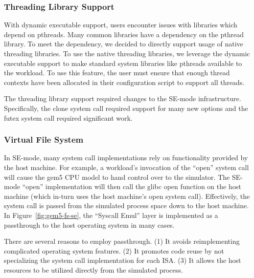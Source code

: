 \subsubsection{Threading Library Support}

With dynamic executable support, users encounter issues with libraries which depend on pthreads.
Many common libraries have a dependency on the pthread library.
To meet the dependency, we decided to directly support usage of native threading libraries.
To use the native threading libraries, we leverage the dynamic executable support to make standard system libraries like pthreads available to the workload.
To use this feature, the user must ensure that enough thread contexts have been allocated in their configuration script to support all threads.


The threading library support required changes to the SE-mode infrastructure.
Specifically, the clone system call required support for many new options and the futex system call required significant work.

\subsubsection{Virtual File System}
\label{sec:vfs}

In SE-mode, many system call implementations rely on functionality provided by the host machine.
For example, a workload's invocation of the ``open'' system call will cause the gem5 CPU model to hand control over to the simulator.
The SE-mode ``open'' implementation will then call the glibc open function on the host machine (which in-turn uses the host machine's open system call).
Effectively, the system call is passed from the simulated process space down to the host machine.
In Figure~\ref{fig:gem5-fs-se}, the ``Syscall Emul'' layer is implemented as a passthrough to the host operating system in many cases.

There are several reasons to employ passthrough. (1) It avoids reimplementing complicated operating system features. (2) It promotes code reuse by not specializing the system call implementation for each ISA. (3) It allows the host resources to be utilized directly from the simulated process.

